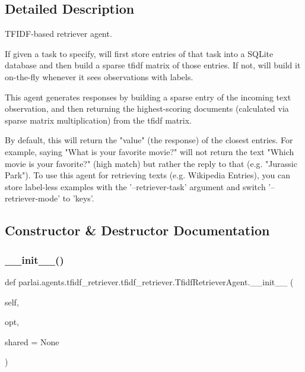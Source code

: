\subsection{Detailed Description}
\begin{DoxyVerb}TFIDF-based retriever agent.

If given a task to specify, will first store entries of that task into
a SQLite database and then build a sparse tfidf matrix of those entries.
If not, will build it on-the-fly whenever it sees observations with labels.

This agent generates responses by building a sparse entry of the incoming
text observation, and then returning the highest-scoring documents
(calculated via sparse matrix multiplication) from the tfidf matrix.

By default, this will return the "value" (the response) of the closest
entries. For example, saying "What is your favorite movie?" will not return
the text "Which movie is your favorite?" (high match) but rather the reply
to that (e.g. "Jurassic Park"). To use this agent for retrieving texts
(e.g. Wikipedia Entries), you can store label-less examples with the
'--retriever-task' argument and switch '--retriever-mode' to 'keys'.
\end{DoxyVerb}
 

\subsection{Constructor \& Destructor Documentation}
\mbox{\label{classparlai_1_1agents_1_1tfidf__retriever_1_1tfidf__retriever_1_1TfidfRetrieverAgent_a41828d27aad3bd78da51c74d24350f46}} 
\subsubsection{\texorpdfstring{\+\_\+\+\_\+init\+\_\+\+\_\+()}{\_\_init\_\_()}}
{\footnotesize\ttfamily def parlai.\+agents.\+tfidf\+\_\+retriever.\+tfidf\+\_\+retriever.\+Tfidf\+Retriever\+Agent.\+\_\+\+\_\+init\+\_\+\+\_\+ (\begin{DoxyParamCaption}\item[{}]{self,  }\item[{}]{opt,  }\item[{}]{shared = {\ttfamily None} }\end{DoxyParamCaption})}



